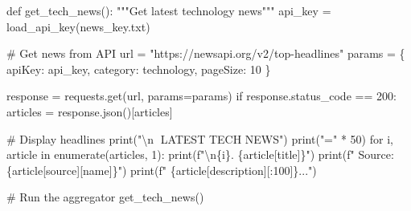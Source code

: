 \documentclass[
  letterpaper,
  DIV=11,
  numbers=noendperiod,
  oneside]{scrreprt}
\newenvironment{Shaded}{}{}
\newcommand{\BuiltInTok}[1]{\textcolor[rgb]{0.84,0.23,0.29}{#1}}
\newcommand{\CharTok}[1]{\textcolor[rgb]{0.01,0.18,0.38}{#1}}
\newcommand{\CommentTok}[1]{\textcolor[rgb]{0.42,0.45,0.49}{#1}}
\newcommand{\ControlFlowTok}[1]{\textcolor[rgb]{0.84,0.23,0.29}{#1}}
\newcommand{\DecValTok}[1]{\textcolor[rgb]{0.00,0.36,0.77}{#1}}
\newcommand{\KeywordTok}[1]{\textcolor[rgb]{0.84,0.23,0.29}{#1}}
\newcommand{\NormalTok}[1]{\textcolor[rgb]{0.14,0.16,0.18}{#1}}
\newcommand{\OperatorTok}[1]{\textcolor[rgb]{0.14,0.16,0.18}{#1}}
\newcommand{\SpecialCharTok}[1]{\textcolor[rgb]{0.00,0.36,0.77}{#1}}
\newcommand{\SpecialStringTok}[1]{\textcolor[rgb]{0.01,0.18,0.38}{#1}}
\newcommand{\StringTok}[1]{\textcolor[rgb]{0.01,0.18,0.38}{#1}}
\begin{document}
\begin{Shaded}
\begin{Highlighting}[]
\KeywordTok{def}\NormalTok{ get\_tech\_news():}
    \CommentTok{"""Get latest technology news"""}
\NormalTok{    api\_key }\OperatorTok{=}\NormalTok{ load\_api\_key(}\StringTok{\textquotesingle{}news\_key.txt\textquotesingle{}}\NormalTok{)}
    
    \CommentTok{\# Get news from API}
\NormalTok{    url }\OperatorTok{=} \StringTok{"https://newsapi.org/v2/top{-}headlines"}
\NormalTok{    params }\OperatorTok{=}\NormalTok{ \{}
        \StringTok{\textquotesingle{}apiKey\textquotesingle{}}\NormalTok{: api\_key,}
        \StringTok{\textquotesingle{}category\textquotesingle{}}\NormalTok{: }\StringTok{\textquotesingle{}technology\textquotesingle{}}\NormalTok{,}
        \StringTok{\textquotesingle{}pageSize\textquotesingle{}}\NormalTok{: }\DecValTok{10}
\NormalTok{    \}}
    
\NormalTok{    response }\OperatorTok{=}\NormalTok{ requests.get(url, params}\OperatorTok{=}\NormalTok{params)}
    \ControlFlowTok{if}\NormalTok{ response.status\_code }\OperatorTok{==} \DecValTok{200}\NormalTok{:}
\NormalTok{        articles }\OperatorTok{=}\NormalTok{ response.json()[}\StringTok{\textquotesingle{}articles\textquotesingle{}}\NormalTok{]}
        
        \CommentTok{\# Display headlines}
        \BuiltInTok{print}\NormalTok{(}\StringTok{"}\CharTok{\textbackslash{}n}\StringTok{📰 LATEST TECH NEWS"}\NormalTok{)}
        \BuiltInTok{print}\NormalTok{(}\StringTok{"="} \OperatorTok{*} \DecValTok{50}\NormalTok{)}
        \ControlFlowTok{for}\NormalTok{ i, article }\KeywordTok{in} \BuiltInTok{enumerate}\NormalTok{(articles, }\DecValTok{1}\NormalTok{):}
            \BuiltInTok{print}\NormalTok{(}\SpecialStringTok{f"}\CharTok{\textbackslash{}n}\SpecialCharTok{\{}\NormalTok{i}\SpecialCharTok{\}}\SpecialStringTok{. }\SpecialCharTok{\{}\NormalTok{article[}\StringTok{\textquotesingle{}title\textquotesingle{}}\NormalTok{]}\SpecialCharTok{\}}\SpecialStringTok{"}\NormalTok{)}
            \BuiltInTok{print}\NormalTok{(}\SpecialStringTok{f"   Source: }\SpecialCharTok{\{}\NormalTok{article[}\StringTok{\textquotesingle{}source\textquotesingle{}}\NormalTok{][}\StringTok{\textquotesingle{}name\textquotesingle{}}\NormalTok{]}\SpecialCharTok{\}}\SpecialStringTok{"}\NormalTok{)}
            \BuiltInTok{print}\NormalTok{(}\SpecialStringTok{f"   }\SpecialCharTok{\{}\NormalTok{article[}\StringTok{\textquotesingle{}description\textquotesingle{}}\NormalTok{][:}\DecValTok{100}\NormalTok{]}\SpecialCharTok{\}}\SpecialStringTok{..."}\NormalTok{)}

\CommentTok{\# Run the aggregator}
\NormalTok{get\_tech\_news()}
\end{Highlighting}
\end{Shaded}
\end{document}
